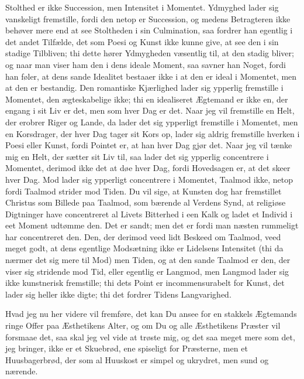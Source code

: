 \documentclass[12pt,a4paper]{article}
\begin{document}
Stolthed er ikke Succession, men Intensitet i Momentet. Ydmyghed lader sig vanskeligt fremstille, fordi den netop er Succession, og medens Betragteren ikke behøver mere end at see Stoltheden i sin Culmination, saa fordrer han egentlig i det andet Tilfælde, det som Poesi og Kunst ikke kunne give, at see den i sin stadige Tilbliven; thi dette hører Ydmygheden væsentlig til, at den stadig bliver; og naar man viser ham den i dens ideale Moment, saa savner han Noget, fordi han føler, at dens sande Idealitet bestaaer ikke i at den er ideal i Momentet, men at den er bestandig. Den romantiske Kjærlighed lader sig ypperlig fremstille i Momentet, den ægteskabelige ikke; thi en idealiseret Ægtemand er ikke en, der engang i sit Liv er det, men som hver Dag er det. Naar jeg vil fremstille en Helt, der erobrer Riger og Lande, da lader det sig ypperligt fremstille i Momentet, men en Korsdrager, der hver Dag tager sit Kors op, lader sig aldrig fremstille hverken i Poesi eller Kunst, fordi Pointet er, at han hver Dag gjør det. Naar jeg vil tænke mig en Helt, der sætter sit Liv til, saa lader det sig ypperlig concentrere i Momentet, derimod ikke det at døe hver Dag, fordi Hovedsagen er, at det skeer hver Dag. Mod lader sig ypperligt concentrere i Momentet, Taalmod ikke, netop fordi Taalmod strider mod Tiden. Du vil sige, at Kunsten dog har fremstillet Christus som Billede paa Taalmod, som bærende al Verdens Synd, at religiøse Digtninger have concentreret al Livets Bitterhed i een Kalk og ladet et Individ i eet Moment udtømme den. Det er sandt; men det er fordi man næsten rummeligt har concentreret den. Den, der derimod veed lidt Beskeed om Taalmod, veed meget godt, at dens egentlige Modsætning ikke er Lidelsens Intensitet (thi da nærmer det sig mere til Mod) men Tiden, og at den sande Taalmod er den, der viser sig stridende mod Tid, eller egentlig er Langmod, men Langmod lader sig ikke kunstnerisk fremstille; thi dets Point er incommensurabelt for Kunst, det lader sig heller ikke digte; thi det fordrer Tidens Langvarighed.

Hvad jeg nu her videre vil fremføre, det kan Du ansee for en stakkels Ægtemands ringe Offer paa Æsthetikens Alter, og om Du og alle Æsthetikens Præster vil forsmaae det, saa skal jeg vel vide at trøste mig, og det saa meget mere som det, jeg bringer, ikke er et Skuebrød, ene spiseligt for Præsterne, men et Huusbagerbrød, der som al Huuskost er simpel og ukrydret, men sund og nærende.
\end{document}
